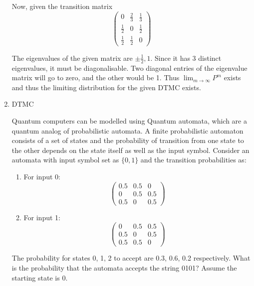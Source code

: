 \documentclass[12pt, oneside]{article}
\begin{document}
\begin{enumerate}
{\begin{enumerate}
{            Now, given the transition matrix 
            \[\begin{pmatrix}
                0 & \frac{2}{3} & \frac{1}{3} \\
                \frac{1}{2} & 0 & \frac{1}{2} \\
                \frac{1}{2} & \frac{1}{2} & 0
            \end{pmatrix}\]
            
            The eigenvalues of the given matrix are \(\pm \frac{1}{2}, 1\).
            Since it has 3 distinct eigenvalues, it must be diagonalisable.
            Two diagonal entries of the eigenvalue matrix will go to zero, and the other
            would be 1. Thus \(\lim_{m \to \infty} P^m\) exists and thus the limiting 
            distribution for the given DTMC exists.
        }
    \end{enumerate}
}


\item {
    DTMC

    Quantum computers can be modelled using Quantum automata, which are a quantum analog
    of probabilistic automata. A finite probabilistic automaton consists of a set of states
    and the probability of transition from one state to the other depends on the state itself
    as well as the input symbol. Consider an automata with input symbol set as \(\{0, 1\}\)
    and the transition probabilities as:
    \begin{enumerate}
        \item {
            For input 0:
            \[\begin{pmatrix}
                0.5 & 0.5 & 0 \\
                0 & 0.5 & 0.5 \\
                0.5 & 0 & 0.5
            \end{pmatrix}\]
        }
        \item {
            For input 1:
            \[\begin{pmatrix}
                0 & 0.5 & 0.5 \\
                0.5 & 0 & 0.5 \\
                0.5 & 0.5 & 0
            \end{pmatrix}\]
        }
    \end{enumerate}
    The probability for states 0, 1, 2 to accept are 0.3, 0.6, 0.2 respectively.
    What is the probability that the automata accepts the string 0101? Assume the starting
    state is 0.

}
\end{enumerate}
\end{document}
